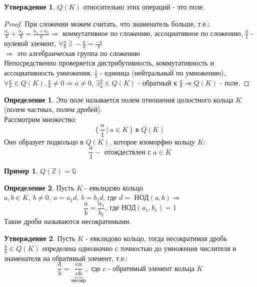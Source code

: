 \documentclass[a4paper, 12pt]{article}
\newcommand{\Q}{\mathbb Q}
\newcommand{\Z}{\mathbb Z}
\theoremstyle{definition}
\newtheorem*{definition}{Определение}
\newtheorem*{subtheorem}{Утверждение}
\newtheorem*{example1}{Пример}
\begin{document}
  \begin{subtheorem}
    $Q(K)$ относительно этих операций - это поле. 
  \end{subtheorem}
  \begin{proof}
    При сложении можем считать, что знаменатель больше, т.е.:\\ 
    $\frac{a_1}{b} + \frac{a_2}{b} = \frac{a_1+a_2}{b} \Longrightarrow $ коммутативное по сложению, ассоциативное по сложению, $\frac{0}{1}$ - нулевой элемент, $\forall \frac{a}{b} \  \exists \ -\frac{a}{b} = \frac{-a}{b}$\\
    $\Longrightarrow $ это алгебраическая группа по сложению\\
    Непосредственно проверяется дистрибутивность, коммутативность и ассоциативность умножения, $\frac{1}{1}$ - единица (нейтральный по умножению),\\ $\forall \frac{a}{b} \in Q(K), \frac{a}{b} \neq 0 \Longrightarrow a \neq 0$, $\exists \frac{b}{a} \in Q(K)$ - обратный к $\frac{a}{b} \Longrightarrow Q(K)$ - поле.        
  \end{proof} 
  \begin{definition}
    Это поле называется полем отношения цолостного кольца $K$ (полем частных, полем дробей).\\ 
    Рассмотрим множество: 
    $$\{ \ \frac{a}{1} \ | \ a \in K\ \} \text{ в } Q(K)$$
    Оно образует подкольцо в $Q(K)$, которое изоморфно кольцу $K$:
    $$\frac{a}{1} - \text{ отождествлен с } a \in K$$
  \end{definition}
  \begin{example1}
    $Q(\Z) = \Q$
  \end{example1} 
  \begin{definition}
    Пусть $K$ - евклидово кольцо\\
    $a, b \in K, \ b\neq 0, \ a = a_1d, \ b = b_1d$, где $d = $ НОД$(a, b)\Longrightarrow $
    $$\frac{a}{b} = \frac{a_1}{b_1}, \  \text{где НОД}(a_1, b_1) = 1$$  
    Такие дроби называются несократимыми.
  \end{definition} 
  \begin{subtheorem}
    Пусть $K$ - евклидово кольцо, тогда несократимая дробь $\frac{a}{b} \in Q(K)$ определена однозначно с точностью до умножения числителя и знаменателя на обратимый элемент, т.е.:
    $$\frac{a}{b} = \underbrace{\frac{ca}{cb}}_{\text{несокр}} , \text{ где } c \text{ - обратимый элемент кольца } K$$ 
  \end{subtheorem}
\end{document}
